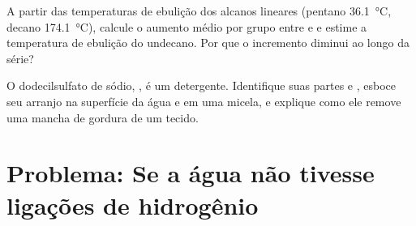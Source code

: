 \begin{exercise}[$\star\star\star$]\label{exo:b1:intermolecular-forces-solvents:11}
A partir das temperaturas de ebulição dos alcanos lineares (pentano
\qty{36.1}{\celsius}, decano \qty{174.1}{\celsius}), calcule o aumento
médio por grupo  entre  e  e estime a temperatura
de ebulição do undecano. Por que o incremento diminui ao longo da
série?
\end{exercise}

\begin{exercise}[$\star\star\star$]\label{exo:b1:intermolecular-forces-solvents:12}
O dodecilsulfato de sódio, , é um detergente.
Identifique suas partes  e , esboce seu arranjo na
superfície da água e em uma micela, e explique como ele remove uma
mancha de gordura de um tecido.
\end{exercise}

\section{Problema: Se a água não tivesse ligações de hidrogênio}

